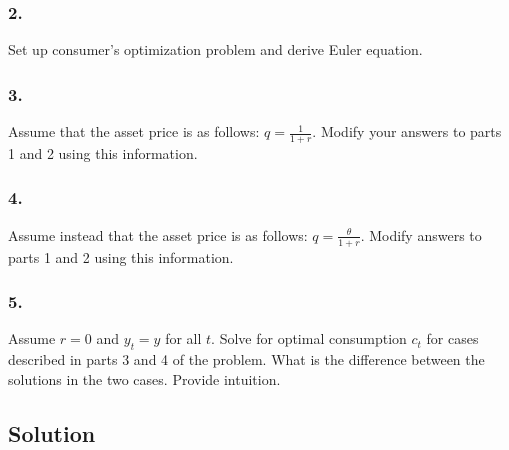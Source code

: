 \documentclass[10pt, a4paper]{article}
\begin{document}
    \subsubsection*{2.}
      Set up consumer's optimization problem and derive Euler equation.
    \subsubsection*{3.}
      Assume that the asset price is as follows: $q=\frac{1}{1+r}$. Modify your answers to parts 1 and 2 using this information.
    \subsubsection*{4.}
      Assume instead that the asset price is as follows: $q=\frac{\theta}{1+r}$. Modify answers to parts 1 and 2 using this information.
    \subsubsection*{5.}
      Assume $r=0$ and $y_t=y$ for all $t$. Solve for optimal consumption $c_t$ for cases described in parts 3 and 4 of the problem. What is the difference between the solutions in the two cases. Provide intuition. 
  \subsection*{Solution}
\end{document}

